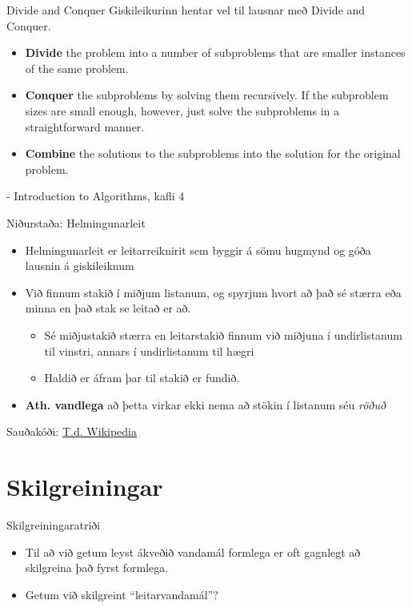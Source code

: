 \documentclass{beamer}
\begin{document}
\begin{frame}{Divide and Conquer}
Giskileikurinn hentar vel til lausnar með Divide and Conquer.
\begin{itemize}
 \item  \textbf{Divide} the problem into a number of subproblems that are smaller instances of the
same problem.
 \item \textbf{Conquer} the subproblems by solving them recursively. If the subproblem sizes are
small enough, however, just solve the subproblems in a straightforward manner.
 \item \textbf{Combine} the solutions to the subproblems into the solution for the original problem.
\end{itemize}
- Introduction to Algorithms, kafli 4
\end{frame}

\begin{frame}{Niðurstaða: Helmingunarleit}
\begin{itemize}
 \item Helmingunarleit er leitarreiknirit sem byggir á sömu hugmynd og góða lausnin á giskileiknum
 \item Við finnum stakið í miðjum listanum, og spyrjum hvort að það sé stærra eða minna en það stak se leitað er að.
 \begin{itemize}
  \item Sé miðjustakið stærra en leitarstakið finnum við miðjuna í undirlistanum til vinstri, annars í undirlistanum til hægri
  \item Haldið er áfram þar til stakið er fundið.
 \end{itemize}
 \item \textbf{Ath. vandlega} að þetta virkar ekki nema að stökin í listanum séu \emph{röðuð}
\end{itemize}
Sauðakóði: \href{http://en.wikipedia.org/wiki/Binary\_search\_algorithm\#Algorithm}{T.d. Wikipedia}
\end{frame}

\section{Skilgreiningar}

\begin{frame}{Skilgreiningaratriði}
\begin{itemize}
 \item Til að við getum leyst ákveðið vandamál formlega er oft gagnlegt að skilgreina það fyrst formlega.
 \item Getum við skilgreint ``leitarvandamál''?
\end{itemize}
\end{frame}
\end{document}
